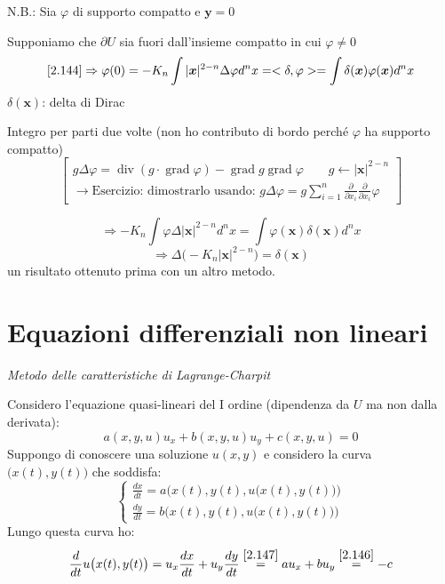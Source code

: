 \documentclass[a4paper,11pt]{report}
\newcommand{\x}{\boldsymbol{x}}
\newcommand{\y}{\boldsymbol{y}}
\begin{document}
N.B.: Sia $\varphi$ di supporto compatto e $\y=0$

Supponiamo che $\partial U$ sia fuori dall'insieme compatto in cui $\varphi \neq 0$
\[
\eqref{2.144} \Rightarrow \varphi(0)=-K_n\int |\x|^{2-n}\Delta \varphi d^n x=<\delta,\varphi>=\int \delta(\x)\varphi(\x)d^n x
\]
$\delta(\x)$: delta di Dirac

Integro per parti due volte (non ho contributo di bordo perch\'e $\varphi$ ha supporto compatto)
\[
\left[
\begin{gathered}
g\Delta\varphi=\operatorname{div} (g\cdot \operatorname{grad}\varphi)-\operatorname{grad} g \operatorname{grad} \varphi \qquad g \leftarrow |\x|^{2-n} \\
\rightarrow \text{Esercizio: dimostrarlo usando: } g\Delta\varphi=g\sum_{i=1}^n \frac{\partial}{\partial x_i} \frac{\partial}{\partial x_i}\varphi
\end{gathered}
\right]
\]

\[
\Rightarrow-K_n\int\varphi \Delta |\x|^{2-n}d^nx=\int \varphi(\x)\delta(\x) d^nx
\]
\begin{equation}
\Rightarrow \Delta\big(-K_n|\x|^{2-n}\big)=\delta(\x)
\label{2.145}
\end{equation}
un risultato ottenuto prima con un altro metodo.

\section{Equazioni differenziali non lineari}

\emph{Metodo delle caratteristiche di Lagrange-Charpit}

Considero l'equazione quasi-lineari del I ordine (dipendenza da $U$ ma non dalla derivata):
\begin{equation}
a(x,y,u)u_x + b(x,y,u)u_y + c(x,y,u)=0 
\label{2.146}
\end{equation}
Suppongo di conoscere una soluzione $u(x,y)$ e considero la curva $\big(x(t),y(t)\big)$ che soddisfa:
\begin{equation}
\begin{cases}
\frac{dx}{dt}=a \big(x(t),y(t),u \big(x(t),y(t) \big) \big) \\
\frac{dy}{dt}=b \big(x(t),y(t),u \big(x(t),y(t) \big) \big)
\end{cases}
\label{2.147}
\end{equation}
Lungo questa curva ho: 
\begin{equation}
\frac{d}{dt}u\big(x(t),y(t)\big)=u_x \frac{dx}{dt} + u_y\frac{dy}{dt}\overset{\eqref{2.147}}{=}au_x + bu_y \overset{\eqref{2.146}}{=}-c
\label{2.148}
\end{equation}
\end{document}
